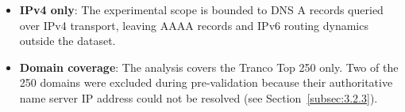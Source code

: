 \begin{itemize}
  \item \textbf{IPv4 only}: The experimental scope is bounded to \ac{DNS} \ac{A} records queried over \ac{IPv4} transport, leaving \ac{AAAA} records and \ac{IPv6} routing dynamics outside the dataset.

  \item \textbf{Domain coverage}: The analysis covers the Tranco Top 250 only. Two of the 250 domains were excluded during pre-validation because their authoritative name server \ac{IP} address could not be resolved (see Section~\ref{subsec:3.2.3}).
\end{itemize}
